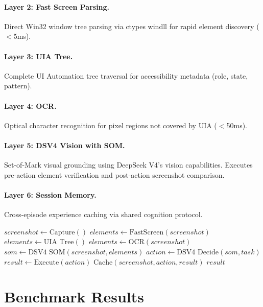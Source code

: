 \documentclass{article}
\begin{document}
\paragraph{Layer 2: Fast Screen Parsing.} Direct Win32 window tree parsing via ctypes windll for rapid element discovery ($<$5ms).

\paragraph{Layer 3: UIA Tree.} Complete UI Automation tree traversal for accessibility metadata (role, state, pattern).

\paragraph{Layer 4: OCR.} Optical character recognition for pixel regions not covered by UIA ($<$50ms).

\paragraph{Layer 5: DSV4 Vision with SOM.} Set-of-Mark visual grounding using DeepSeek V4's vision capabilities. Executes pre-action element verification and post-action screenshot comparison.

\paragraph{Layer 6: Session Memory.} Cross-episode experience caching via shared cognition protocol.

\begin{algorithm}
\caption{Cascade Vision Pipeline Inference}
\begin{algorithmic}[1]
\State $screenshot \gets \text{Capture}()$
\State $elements \gets \text{FastScreen}(screenshot)$
    \State $elements \gets \text{UIA Tree}()$
\EndIf
{}
    \State $elements \gets \text{OCR}(screenshot)$
\EndIf
\State $som \gets \text{DSV4 SOM}(screenshot, elements)$
\State $action \gets \text{DSV4 Decide}(som, task)$
\State $result \gets \text{Execute}(action)$
\State $\text{Cache}(screenshot, action, result)$
\State \Return $result$
\end{algorithmic}
\end{algorithm}

\section{Benchmark Results}
\end{document}
